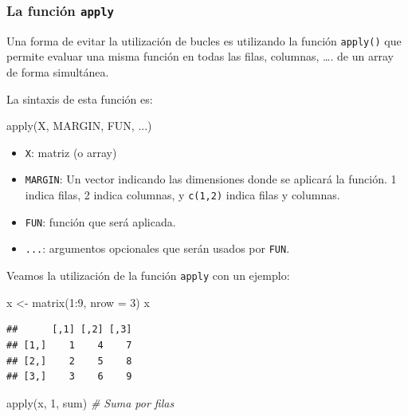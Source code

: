 \documentclass[
]{book}
\newenvironment{Shaded}{\begin{snugshade}}{\end{snugshade}}
\newcommand{\AttributeTok}[1]{\textcolor[rgb]{0.77,0.63,0.00}{#1}}
\newcommand{\CommentTok}[1]{\textcolor[rgb]{0.56,0.35,0.01}{\textit{#1}}}
\newcommand{\DecValTok}[1]{\textcolor[rgb]{0.00,0.00,0.81}{#1}}
\newcommand{\FunctionTok}[1]{\textcolor[rgb]{0.00,0.00,0.00}{#1}}
\newcommand{\NormalTok}[1]{#1}
\newcommand{\OtherTok}[1]{\textcolor[rgb]{0.56,0.35,0.01}{#1}}
\newcommand{\SpecialCharTok}[1]{\textcolor[rgb]{0.00,0.00,0.00}{#1}}
\providecommand{\tightlist}{%
  \setlength{\itemsep}{0pt}\setlength{\parskip}{0pt}}
\theoremstyle{break}
\theoremstyle{nonumberplain}
\begin{document}
\hypertarget{la-funciuxf3n-apply}{%
\subsubsection{\texorpdfstring{La función \texttt{apply}}{La función apply}}\label{la-funciuxf3n-apply}}

Una forma de evitar la
utilización de bucles es utilizando la función \texttt{apply()} que permite
evaluar una misma función en todas las filas, columnas, \ldots. de un array
de forma simultánea.

La sintaxis de esta función es:

\begin{Shaded}
\begin{Highlighting}[]
\FunctionTok{apply}\NormalTok{(X, MARGIN, FUN, ...)}
\end{Highlighting}
\end{Shaded}

\begin{itemize}
\tightlist
\item
  \texttt{X}: matriz (o array)
\item
  \texttt{MARGIN}: Un vector indicando las dimensiones donde se aplicará
  la función. 1 indica filas, 2 indica columnas, y \texttt{c(1,2)} indica
  filas y columnas.
\item
  \texttt{FUN}: función que será aplicada.
\item
  \texttt{...}: argumentos opcionales que serán usados por \texttt{FUN}.
\end{itemize}

Veamos la utilización de la función \texttt{apply} con un ejemplo:

\begin{Shaded}
\begin{Highlighting}[]
\NormalTok{x }\OtherTok{\textless{}{-}} \FunctionTok{matrix}\NormalTok{(}\DecValTok{1}\SpecialCharTok{:}\DecValTok{9}\NormalTok{, }\AttributeTok{nrow =} \DecValTok{3}\NormalTok{)}
\NormalTok{x}
\end{Highlighting}
\end{Shaded}

\begin{verbatim}
##      [,1] [,2] [,3]
## [1,]    1    4    7
## [2,]    2    5    8
## [3,]    3    6    9
\end{verbatim}

\begin{Shaded}
\begin{Highlighting}[]
\FunctionTok{apply}\NormalTok{(x, }\DecValTok{1}\NormalTok{, sum)    }\CommentTok{\# Suma por filas}
\end{Highlighting}
\end{Shaded}
\end{document}
